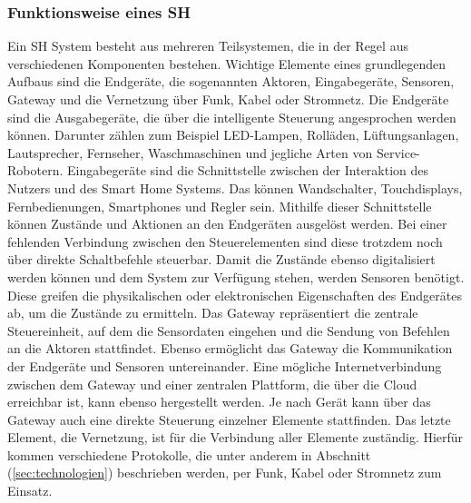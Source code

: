     \subsubsection*{Funktionsweise eines \acl{SH}}
    \label{subsubsec:funktionsweise}
        Ein \acl{SH} System besteht aus mehreren Teilsystemen, die in der Regel aus verschiedenen Komponenten bestehen. 
        Wichtige Elemente eines grundlegenden Aufbaus sind die Endgeräte, die sogenannten Aktoren, Eingabegeräte, 
        Sensoren, Gateway und die Vernetzung über Funk, Kabel oder Stromnetz. Die Endgeräte sind die Ausgabegeräte, die 
        über die intelligente Steuerung angesprochen werden können. Darunter zählen zum Beispiel 
        LED-Lampen, Rolläden, Lüftungsanlagen, Lautsprecher, Fernseher, Waschmaschinen und jegliche Arten von 
        Service-Robotern. Eingabegeräte sind die Schnittstelle zwischen der Interaktion des Nutzers und des 
        Smart Home Systems. Das können Wandschalter, Touchdisplays, Fernbedienungen, Smartphones und Regler sein. 
        Mithilfe dieser Schnittstelle können Zustände und Aktionen an den Endgeräten ausgelöst werden. Bei einer 
        fehlenden Verbindung zwischen den Steuerelementen sind diese trotzdem noch über direkte Schaltbefehle steuerbar. 
        Damit die Zustände ebenso digitalisiert werden können und dem System zur Verfügung stehen, werden Sensoren 
        benötigt. Diese greifen die physikalischen oder elektronischen Eigenschaften des Endgerätes ab, um die 
        Zustände zu ermitteln. Das Gateway repräsentiert die zentrale Steuereinheit, auf dem die Sensordaten 
        eingehen und die Sendung von Befehlen an die Aktoren stattfindet. Ebenso ermöglicht das Gateway die 
        Kommunikation der Endgeräte und Sensoren untereinander. Eine mögliche Internetverbindung zwischen 
        dem Gateway und einer zentralen Plattform, die über die Cloud erreichbar ist, kann ebenso hergestellt werden. 
        Je nach Gerät kann über das Gateway auch eine direkte Steuerung einzelner Elemente stattfinden. Das letzte 
        Element, die Vernetzung, ist für die Verbindung aller Elemente zuständig. Hierfür kommen verschiedene 
        Protokolle, die unter anderem in Abschnitt (\ref{sec:technologien}) beschrieben werden, 
        per Funk, Kabel oder Stromnetz zum Einsatz. %
        \\
